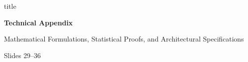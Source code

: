 \documentclass[aspectratio=169, 10pt]{beamer}
\begin{document}
\begin{frame}[plain]
  \vspace*{1.0cm}
  \begin{beamercolorbox}[wd=\linewidth,rounded=true,sep=12pt,center]{title}
    {\Huge\bfseries Technical Appendix\par}
    \vskip 8pt
    {\large\color{LightPurple} Mathematical Formulations, Statistical Proofs, and Architectural Specifications\par}
    \vskip 12pt
    {\footnotesize Slides 29--36}
  \end{beamercolorbox}
\end{frame}
\end{document}

